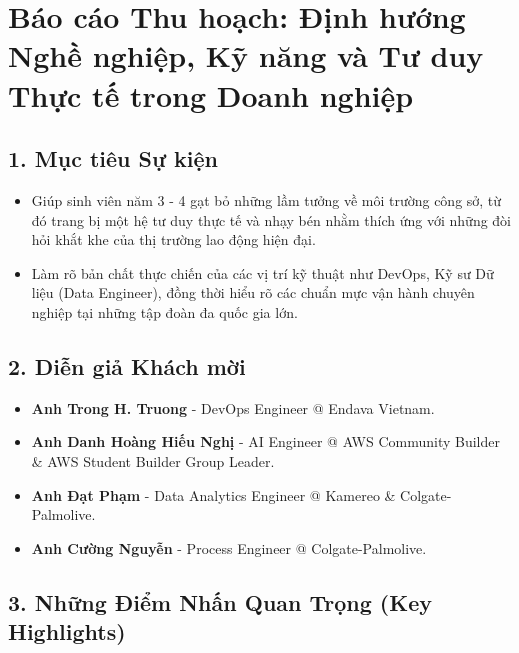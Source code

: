\hypertarget{buxe1o-cuxe1o-thu-houx1ea1ch-ux111ux1ecbnh-hux1b0ux1edbng-nghux1ec1-nghiux1ec7p-kux1ef9-nux103ng-vuxe0-tux1b0-duy-thux1ef1c-tux1ebf-trong-doanh-nghiux1ec7p}{%
\section{Báo cáo Thu hoạch: Định hướng Nghề nghiệp, Kỹ năng và Tư duy
Thực tế trong Doanh
nghiệp}}

\hypertarget{mux1ee5c-tiuxeau-sux1ef1-kiux1ec7n}{%
\subsection{1. Mục tiêu Sự
kiện}}

\begin{itemize}
\tightlist
\item
  Giúp sinh viên năm 3 - 4 gạt bỏ những lầm tưởng về môi trường công sở,
  từ đó trang bị một hệ tư duy thực tế và nhạy bén nhằm thích ứng với
  những đòi hỏi khắt khe của thị trường lao động hiện đại.
\item
  Làm rõ bản chất thực chiến của các vị trí kỹ thuật như DevOps, Kỹ sư
  Dữ liệu (Data Engineer), đồng thời hiểu rõ các chuẩn mực vận hành
  chuyên nghiệp tại những tập đoàn đa quốc gia lớn.
\end{itemize}

\hypertarget{diux1ec5n-giux1ea3-khuxe1ch-mux1eddi}{%
\subsection{2. Diễn giả Khách
mời}}

\begin{itemize}
\tightlist
\item
  \textbf{Anh Trong H. Truong} - DevOps Engineer @ Endava Vietnam.
\item
  \textbf{Anh Danh Hoàng Hiếu Nghị} - AI Engineer @ AWS Community
  Builder \& AWS Student Builder Group Leader.
\item
  \textbf{Anh Đạt Phạm} - Data Analytics Engineer @ Kamereo \&
  Colgate-Palmolive.
\item
  \textbf{Anh Cường Nguyễn} - Process Engineer @ Colgate-Palmolive.
\end{itemize}

\hypertarget{nhux1eefng-ux111iux1ec3m-nhux1ea5n-quan-trux1ecdng-key-highlights}{%
\subsection{3. Những Điểm Nhấn Quan Trọng (Key
Highlights)}}

